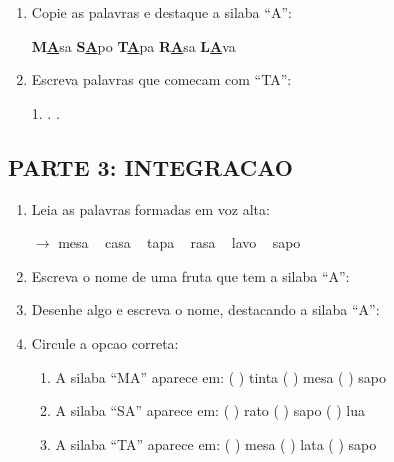 \begin{exercicio}
\begin{enumerate}[resume]
  \item Copie as palavras e destaque a silaba ``A'':
  \begin{center}
  \textbf{M}\underline{\textbf{A}}sa \quad \textbf{S}\underline{\textbf{A}}po \quad \textbf{T}\underline{\textbf{A}}pa \quad \textbf{R}\underline{\textbf{A}}sa \quad \textbf{L}\underline{\textbf{A}}va
  \end{center}

  \item Escreva palavras que comecam com ``TA'':
  \begin{center}
  1. \underline{\hspace{3cm}} . \underline{\hspace{3cm}} . \underline{\hspace{3cm}}
  \end{center}
\end{enumerate}

\subsection*{PARTE 3: INTEGRACAO}

\begin{enumerate}[resume]
  \item Leia as palavras formadas em voz alta:
  \begin{center}
  $\rightarrow$ mesa  ~  casa  ~  tapa  ~  rasa  ~  lavo  ~  sapo
  \end{center}

  \item Escreva o nome de uma fruta que tem a silaba ``A'':
  \begin{center}
  \underline{\hspace{6cm}}
  \end{center}

  \item Desenhe algo e escreva o nome, destacando a silaba ``A'':
  \begin{center}
  \end{center}

  \item Circule a opcao correta:
  \begin{enumerate}[label=(\alph*)]
    \item A silaba ``MA'' aparece em: ( ) tinta ( ) mesa ( ) sapo
    \item A silaba ``SA'' aparece em: ( ) rato ( ) sapo ( ) lua
    \item A silaba ``TA'' aparece em: ( ) mesa ( ) lata ( ) sapo
  \end{enumerate}


\end{enumerate}
\end{exercicio}
